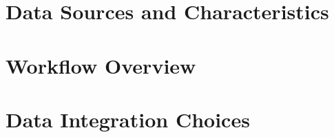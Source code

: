 \documentclass{article}
\begin{document}

\section{Data Sources and Characteristics}


\section{Workflow Overview}


\section{Data Integration Choices}
\end{document}
